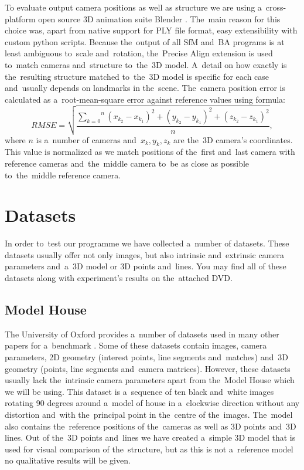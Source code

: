 \vspace{.5cm}
To evaluate output camera positions as well as structure we are using a~cross-platform open source 3D animation suite Blender \cite{www:blender}. The~main reason for this choice was, apart from native support for PLY file format, easy extensibility with custom python scripts. Because the~output of all SfM and~BA programs is at least ambiguous to~scale and~rotation, the~Precise Align extension \cite{www:blender_precise_align} is used to~match cameras and~structure to~the~3D model. A~detail on how exactly is the~resulting structure matched to~the~3D model is specific for each case and~usually depends on landmarks in the~scene. The~camera position error is calculated as a~root-mean-square error against reference values using formula:
\begin{equation}
	RMSE=\sqrt{\frac{\overset{n}{\underset{k=0}{\sum}} (x_{k_2}-x_{k_1})^2 + (y_{k_2}-y_{k_1})^2 + (z_{k_2}-z_{k_1})^2}{n}},
	\label{eq:RMSE}
\end{equation}
where $n$ is a~number of cameras and~$x_{k}, y_k, z_k$ are the~3D camera's coordinates. This value is normalized as we match positions of the~first and~last camera with reference cameras and~the~middle camera to~be as close as possible to~the~middle reference camera.

\section{Datasets}
\label{sec:experiments-datasets}
In order to~test our programme we have collected a~number of datasets. These datasets usually offer not only images, but also intrinsic and~extrinsic camera parameters and~a~3D model or 3D points and~lines. You may find all of these datasets along with experiment's results on the~attached DVD.

\subsection*{Model House}
The University of Oxford provides a~number of  datasets used in many other papers for a~benchmark \cite{www:oxford_models}. Some of these datasets contain images, camera parameters, 2D geometry (interest points, line segments and~matches) and~3D geometry (points, line segments and~camera matrices). However, these datasets usually lack the~intrinsic camera parameters apart from the~Model House which we will be using. This dataset is a~sequence of ten black and~white images rotating 90 degrees around a~model of house in a~clockwise direction without any distortion and~with the~principal point in the~centre of the~images. The~model also contains the~reference positions of the~cameras as well as 3D points and~3D lines. Out of the~3D points and~lines we have created a~simple 3D model that is used for visual comparison of the~structure, but as this is not a~reference model no qualitative results will be given.

